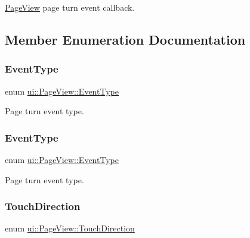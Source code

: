 \hyperlink{classui_1_1PageView}{Page\+View} page turn event callback. 

\subsection{Member Enumeration Documentation}
\mbox{\label{classui_1_1PageView_aeedcbcc6dcac6fc377ef09132b3ae495}} 
\subsubsection{\texorpdfstring{Event\+Type}{EventType}\hspace{0.1cm}{\footnotesize\ttfamily [1/2]}}
{\footnotesize\ttfamily enum \hyperlink{classui_1_1PageView_aeedcbcc6dcac6fc377ef09132b3ae495}{ui\+::\+Page\+View\+::\+Event\+Type}\hspace{0.3cm}{\ttfamily [strong]}}

Page turn event type. \mbox{\label{classui_1_1PageView_aeedcbcc6dcac6fc377ef09132b3ae495}} 
\subsubsection{\texorpdfstring{Event\+Type}{EventType}\hspace{0.1cm}{\footnotesize\ttfamily [2/2]}}
{\footnotesize\ttfamily enum \hyperlink{classui_1_1PageView_aeedcbcc6dcac6fc377ef09132b3ae495}{ui\+::\+Page\+View\+::\+Event\+Type}\hspace{0.3cm}{\ttfamily [strong]}}

Page turn event type. \mbox{\label{classui_1_1PageView_a95b0e3ff5da243df2a7dfc1c05d7017c}} 
\subsubsection{\texorpdfstring{Touch\+Direction}{TouchDirection}\hspace{0.1cm}{\footnotesize\ttfamily [1/2]}}
{\footnotesize\ttfamily enum \hyperlink{classui_1_1PageView_a95b0e3ff5da243df2a7dfc1c05d7017c}{ui\+::\+Page\+View\+::\+Touch\+Direction}\hspace{0.3cm}{\ttfamily [strong]}}

